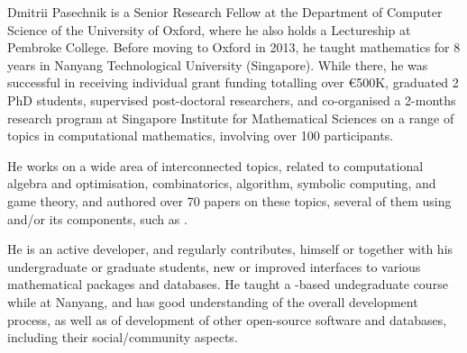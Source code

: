 \begin{participant}[type=leadPI,PM=24,gender=male]{Dmitrii Pasechnik}
  is a Senior Research Fellow at the Department of Computer Science of the University of
  Oxford, where he also holds a Lectureship at Pembroke College. Before moving to Oxford
  in 2013, he taught mathematics for 8 years in Nanyang Technological University
  (Singapore). While there, he was successful in receiving individual grant funding
  totalling over \euro 500K, graduated 2 PhD students, supervised post-doctoral
  researchers, and co-organised a 2-months research program at Singapore Institute for
  Mathematical Sciences on a range of topics in computational mathematics, involving over
  100 participants.

  He works on a wide area of interconnected topics, related to computational algebra and
  optimisation, combinatorics, algorithm, symbolic computing, and game theory, and
  authored over 70 papers on these topics, several of them using \Sage and/or its
  components, such as \GAP.

  He is an active \Sage developer, and regularly contributes, himself or together with his
  undergraduate or graduate students, new or improved \Sage interfaces to various
  mathematical packages and databases. He taught a \Sage-based undegraduate course while at
  Nanyang, and has good understanding of the overall \Sage development process, as well as
  of development of other open-source software and databases, including their
  social/community aspects.
\end{participant}
